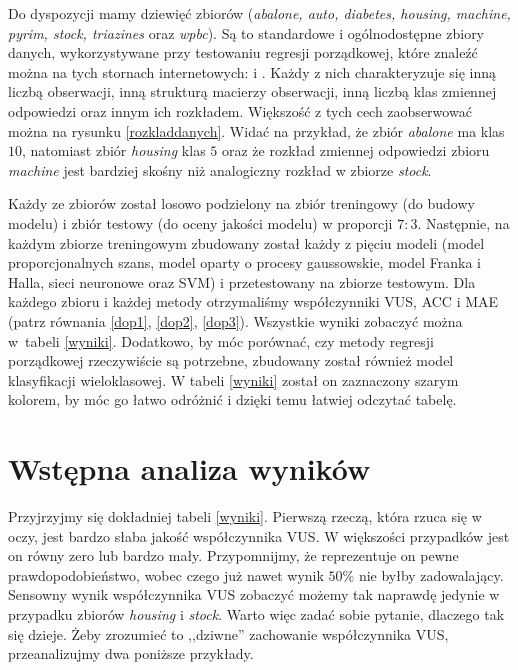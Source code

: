 \documentclass{mini}
\begin{document}
Do dyspozycji mamy dziewięć zbiorów (\textit{abalone, auto, diabetes, housing, machine, pyrim, stock, triazines} oraz \textit{wpbc}). Są to standardowe i ogólnodostępne zbiory danych, wykorzystywane przy testowaniu regresji porządkowej, które znaleźć można na tych stornach internetowych: \cite{zbiorki} i \cite{zbiorki2}. Każdy z nich charakteryzuje się inną liczbą obserwacji, inną strukturą macierzy obserwacji, inną liczbą klas zmiennej odpowiedzi oraz innym ich rozkładem. Większość z tych cech zaobserwować można na rysunku \ref{rozkladdanych}. Widać na przykład, że zbiór \textit{abalone} ma klas~$10$, natomiast zbiór \textit{housing} klas $5$ oraz że rozkład zmiennej odpowiedzi zbioru \textit{machine} jest bardziej skośny niż analogiczny rozkład w zbiorze \textit{stock}. 

Każdy ze zbiorów został losowo podzielony na zbiór treningowy (do budowy modelu) i zbiór testowy (do oceny jakości modelu) w proporcji $7:3$. Następnie, na każdym zbiorze treningowym zbudowany został każdy z pięciu modeli (model proporcjonalnych szans, model oparty o procesy gaussowskie, model Franka i Halla, sieci neuronowe oraz SVM) i przetestowany na zbiorze testowym. Dla każdego zbioru i każdej metody otrzymaliśmy współczynniki VUS, ACC i MAE (patrz równania \eqref{dop1}, \eqref{dop2}, \eqref{dop3}). Wszystkie wyniki zobaczyć można w~tabeli \ref{wyniki}. Dodatkowo, by móc porównać, czy metody regresji porządkowej rzeczywiście są potrzebne, zbudowany został również model klasyfikacji wieloklasowej. W tabeli \ref{wyniki} został on zaznaczony szarym kolorem, by móc go łatwo odróżnić i dzięki temu łatwiej odczytać tabelę.

\section{Wstępna analiza wyników}

Przyjrzyjmy się dokładniej tabeli \ref{wyniki}. Pierwszą rzeczą, która rzuca się w oczy, jest bardzo słaba jakość współczynnika VUS. W większości przypadków jest on równy zero lub bardzo mały. Przypomnijmy, że reprezentuje on pewne prawdopodobieństwo, wobec czego już nawet wynik $50\%$ nie byłby zadowalający. Sensowny wynik współczynnika VUS zobaczyć możemy tak naprawdę jedynie w przypadku zbiorów \textit{housing} i \textit{stock}. Warto więc zadać sobie pytanie, dlaczego tak się dzieje.  Żeby zrozumieć to ,,dziwne'' zachowanie współczynnika VUS, przeanalizujmy dwa poniższe przykłady.
\end{document}
